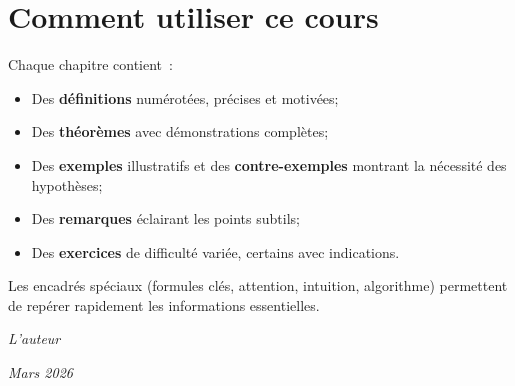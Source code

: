 \section*{Comment utiliser ce cours}

Chaque chapitre contient~:
\begin{itemize}
    \item Des \textbf{d\'efinitions} num\'erot\'ees, pr\'ecises et motiv\'ees;
    \item Des \textbf{th\'eor\`emes} avec d\'emonstrations compl\`etes;
    \item Des \textbf{exemples} illustratifs et des \textbf{contre-exemples}
          montrant la n\'ecessit\'e des hypoth\`eses;
    \item Des \textbf{remarques} \'eclairant les points subtils;
    \item Des \textbf{exercices} de difficult\'e vari\'ee, certains avec indications.
\end{itemize}

Les encadr\'es sp\'eciaux (formules cl\'es, attention, intuition, algorithme)
permettent de rep\'erer rapidement les informations essentielles.

\bigskip
\hfill \textit{L'auteur}

\hfill \textit{Mars 2026}
